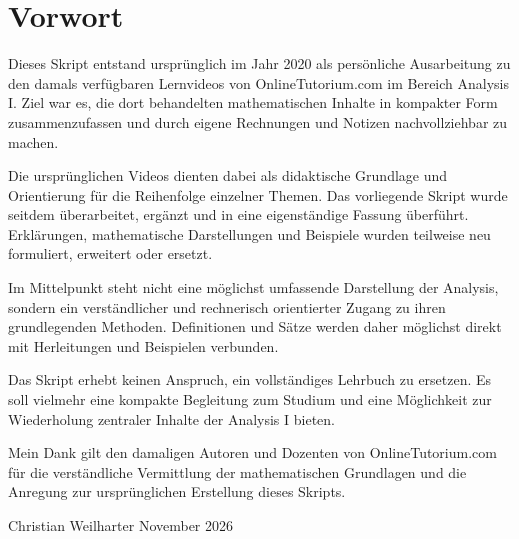 \documentclass[a4paper,11pt]{report}
\begin{document}
		
		\vspace*{\fill}
		
		\clearpage
	
	
	
	\chapter*{Vorwort}

	
	Dieses Skript entstand ursprünglich im Jahr 2020 als persönliche Ausarbeitung zu den damals verfügbaren Lernvideos von OnlineTutorium.com im Bereich Analysis I. Ziel war es, die dort behandelten mathematischen Inhalte in kompakter Form zusammenzufassen und durch eigene Rechnungen und Notizen nachvollziehbar zu machen.
	
	Die ursprünglichen Videos dienten dabei als didaktische Grundlage und Orientierung für die Reihenfolge einzelner Themen. Das vorliegende Skript wurde seitdem überarbeitet, ergänzt und in eine eigenständige Fassung überführt. Erklärungen, mathematische Darstellungen und Beispiele wurden teilweise neu formuliert, erweitert oder ersetzt.
	
	Im Mittelpunkt steht nicht eine möglichst umfassende Darstellung der Analysis, sondern ein verständlicher und rechnerisch orientierter Zugang zu ihren grundlegenden Methoden. Definitionen und Sätze werden daher möglichst direkt mit Herleitungen und Beispielen verbunden.
	
	Das Skript erhebt keinen Anspruch, ein vollständiges Lehrbuch zu ersetzen. Es soll vielmehr eine kompakte Begleitung zum Studium und eine Möglichkeit zur Wiederholung zentraler Inhalte der Analysis I bieten.
	
	Mein Dank gilt den damaligen Autoren und Dozenten von OnlineTutorium.com für die verständliche Vermittlung der mathematischen Grundlagen und die Anregung zur ursprünglichen Erstellung dieses Skripts.
	
	Christian Weilharter
	November 2026

	
	
	
	\clearpage
	
	
	
	\tableofcontents
	
	
    
%
%	
%	
%	
%	
%	
%	
%	
%	
%	
%	
%	
\end{document}
